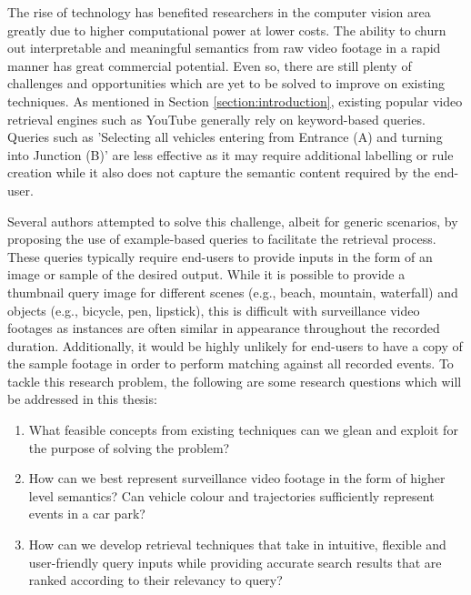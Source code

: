 
The rise of technology has benefited researchers in the computer vision area greatly due to higher computational power at lower costs. The ability to churn out interpretable and meaningful semantics from raw video footage in a rapid manner has great commercial potential. Even so, there are still plenty of challenges and opportunities which are yet to be solved to improve on existing techniques. As mentioned in Section \ref{section:introduction}, existing popular video retrieval engines such as YouTube generally rely on keyword-based queries. Queries such as 'Selecting all vehicles entering from Entrance (A) and turning into Junction (B)' are less effective as it may require additional labelling or rule creation while it also does not capture the semantic content required by the end-user.

Several authors attempted to solve this challenge,
albeit for generic scenarios,
by proposing the use of example-based queries \cite{zhang2017car, liu2016large, castanon2016retrieval} to facilitate the retrieval process.
These queries typically require end-users to provide inputs in the form of an image or sample of the desired output. While it is possible to provide a thumbnail query image for different scenes (e.g., beach, mountain, waterfall) and objects (e.g., bicycle, pen, lipstick), this is difficult with surveillance video footages as instances are often similar in appearance throughout the recorded duration. Additionally, it would be highly unlikely for end-users to have a copy of the sample footage in order to perform matching against all recorded events.
To tackle this research problem, the following are some research questions which will be addressed in this thesis:
\begin{enumerate}
\item What feasible concepts from existing techniques can we glean and exploit for the purpose of solving the problem?
\item How can we best represent surveillance video footage in the form of higher level semantics? Can vehicle colour and trajectories sufficiently represent events in a car park? 
\item How can we develop retrieval techniques that take in intuitive, flexible and user-friendly query inputs while providing accurate search results that are ranked according to their relevancy to query?
\end{enumerate}


